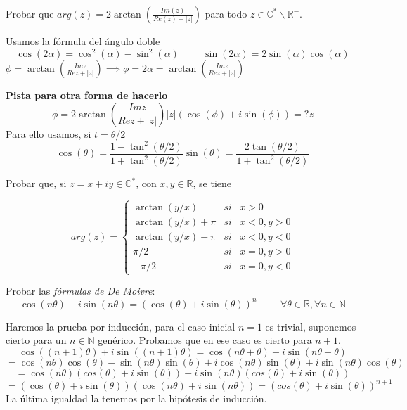 \begin{ejer}
	Probar que $arg(z) = 2\arctan\left( \frac{Im(z)}{Re(z) + |z|} \right)$ para todo  $z\in\mathbb{C}^{\ast}\backslash\mathbb{R}^{-}$.
\end{ejer}

\begin{sol}

Usamos la fórmula del ángulo doble
$$ \cos(2\alpha) = \cos^2(\alpha)-\sin^2(\alpha) \hspace{1cm} \sin(2\alpha) = 2\sin(\alpha)\cos(\alpha) $$
$\phi = \arctan\left(\frac{Im z}{Re z + |z|}\right) \implies \phi = 2\alpha = \arctan\left(\frac{Im z}{Re z + |z|}\right) $

\textbf{Pista para otra forma de hacerlo}
$$ \phi = 2\arctan ( \frac{Im z}{Re z + |z|} ) 
|z|(\cos(\phi)+i\sin(\phi)) =? z $$
Para ello usamos, si $t=\theta/2$
$$ \cos(\theta) = \frac{1-\tan^2(\theta/2)}{1+\tan^2(\theta/2)}
\sin(\theta) = \frac{2\tan(\theta/2)}{1+\tan^2(\theta/2)} $$
\end{sol}


\begin{ejer}
	Probar que, si $z=x+iy\in\mathbb{C}^{\ast}$, con $x,y\in\mathbb{R}$, se tiene
	
	$$
	arg(z) = \left\{ 
		\begin{array}{lcc}
			\arctan(y/x) &   si  & x>0 \\
			\arctan(y/x) + \pi & si & x<0, y>0 \\
			\arctan(y/x)-\pi & si & x<0,y<0 \\
			\pi/2 & si & x=0,y>0 \\
			-\pi/2 & si & x=0,y<0 
		\end{array}
	\right.
	$$
\end{ejer}


\begin{ejer}
	Probar las \textit{fórmulas de De Moivre}:
	$$ \cos(n\theta) + i\sin(n\theta) = (\cos(\theta)+i\sin(\theta))^n \hspace{1cm}\forall\theta\in\mathbb{R}, \forall n\in\mathbb{N} $$
\end{ejer}


\begin{sol}
Haremos la prueba por inducción, para el caso inicial $n=1$ es trivial, suponemos cierto para un $n\in\mathbb{N}$ genérico.
Probamos que en ese caso es cierto para $n+1$.
$$ 
\cos((n+1)\theta)+i\sin((n+1)\theta) 
=
\cos(n\theta+\theta)+i\sin(n\theta+\theta)
$$
$$ =
\cos(n\theta) \cos(\theta)- \sin(n\theta)\sin(\theta) +i\cos(n\theta)\sin(\theta) + i\sin(n\theta)\cos(\theta) $$
$$ =
\cos(n\theta)(cos(\theta)+i\sin(\theta)) + i\sin(n\theta)(cos(\theta)+i\sin(\theta))
$$
$$=
(\cos(\theta)+i\sin(\theta)) (\cos(n\theta)+i\sin(n\theta))
=
(cos(\theta)+i\sin(\theta))^{n+1}
$$
La última igualdad la tenemos por la hipótesis de inducción.
\end{sol}



